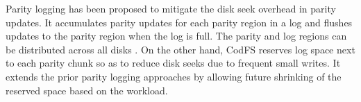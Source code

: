 Parity logging \cite{chen94,stodolsky93} has been proposed to mitigate the disk
seek overhead in parity updates.  It accumulates parity updates for each
parity region in a log and flushes updates to the parity region when the log
is full.  The parity and log regions can be distributed across all disks
\cite{stodolsky93}.  On the other hand, CodFS reserves log space next to each
parity chunk so as to reduce disk seeks due to frequent small writes.  It
extends the prior parity logging approaches by allowing future shrinking of
the reserved space based on the workload. 



